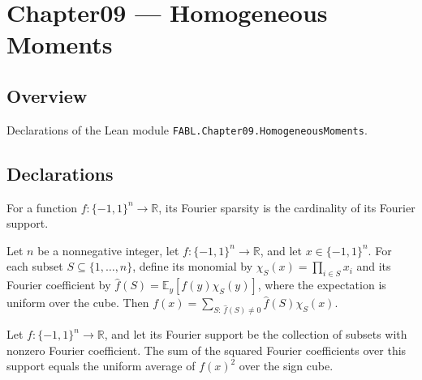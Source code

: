 \chapter{Chapter09 — Homogeneous Moments}
\section{Overview}

Declarations of the Lean module \texttt{FABL.Chapter09.HomogeneousMoments}.

\section{Declarations}

\begin{definition}
\label{FABL.fourierSparsity}
\leanok
{}
For a function $f:\{−1,1\}^n\to\mathbb R$, its Fourier sparsity is the cardinality of
its Fourier support.
\end{definition}

\begin{theorem}
\label{FABL.fourier_expansion_support}
\leanok
{}
Let $n$ be a nonnegative integer, let $f:\{-1,1\}^n\to\mathbb R$, and let
$x\in\{-1,1\}^n$. For each subset $S\subseteq\{1,\ldots,n\}$, define its monomial by
$\chi_S(x)=\prod_{i\in S}x_i$ and its Fourier coefficient by $\widehat f(S)=\mathbb
E_y[f(y)\chi_S(y)]$, where the expectation is uniform over the cube. Then
$f(x)=\sum_{S:\,\widehat f(S)\ne0}\widehat f(S)\chi_S(x)$.
\end{theorem}

\begin{theorem}
\label{FABL.sum_sq_fourierCoeff_support}
\leanok
{}
Let $f:\{-1,1\}^n\to\mathbb R$, and let its Fourier support be the collection of subsets
with nonzero Fourier coefficient. The sum of the squared Fourier coefficients over this
support equals the uniform average of $f(x)^2$ over the sign cube.
\end{theorem}


